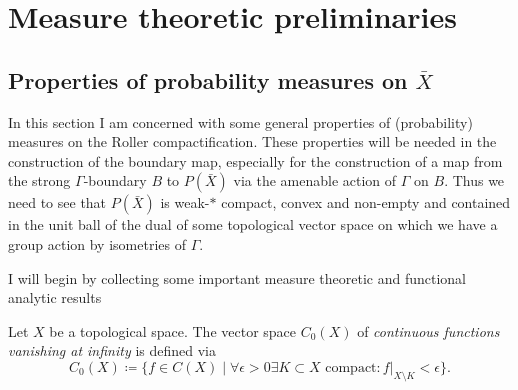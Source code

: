 \section{Measure theoretic preliminaries}
\label{sec:measure}

\subsection{Properties of probability measures on \(\bar X\)}
\label{sec:prob}

In this section I am concerned with some general properties of (probability) measures on the Roller compactification. These properties will be needed in the construction of the boundary map, especially for the construction of a map from the strong \(\Gamma\)-boundary \(B\) to \(P(\bar X)\) via the amenable action of \(\Gamma\) on \(B\). Thus we need to see that \(P(\bar X)\) is weak-\(\ast\) compact, convex and non-empty and contained in the unit ball of the dual of some topological vector space on which we have a group action by isometries of \(\Gamma\).

I will begin by collecting some important measure theoretic and functional analytic results

\begin{defin}
  \label{def:vanishing}
  Let \(X\) be a topological space. The vector space \(C_0(X)\) of \emph{continuous functions vanishing at infinity} is defined via
  \[
    C_0(X) \coloneqq \{f \in C(X) \mid \forall \epsilon > 0 \exists K \subset X \text{ compact}\colon f|_{X\setminus K} < \epsilon\}.
  \]
\end{defin}

